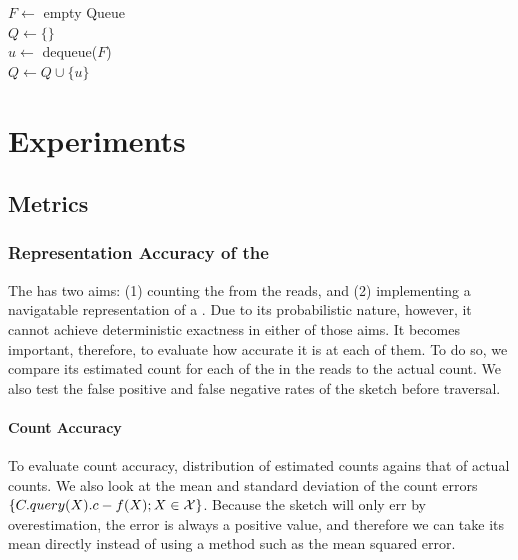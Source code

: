 \begin{algorithm}
	\caption{$T.\mathit{traverse}(\strsetname{S}, t)$}\label{alg:dbht-navigate}
  $F \gets$ empty Queue\\
  $Q \gets \{\}$\\
   {
    $u \gets$ dequeue($F$)\\
    $Q \gets Q \cup \{u\}$\\
  }
\end{algorithm}



\section{Experiments}

\subsection{Metrics}


\subsubsection{Representation Accuracy of the \dBCM}

The \dBCM has two aims: (1) counting the  from the reads, and (2) implementing a navigatable representation of a \dBG. Due to its probabilistic nature, however, it cannot achieve deterministic exactness in either of those aims. It becomes important, therefore, to evaluate how accurate it is at each of them. To do so, we compare its estimated count for each of the  in the reads to the  actual count. We also test the false positive and false negative rates of the sketch before traversal.

\paragraph{Count Accuracy} To evaluate count accuracy, distribution of estimated counts agains that of actual counts. We also look at the mean and standard deviation of the count errors $\{C.query(X).c - f(X) ; X \in \readset\}$. Because the \cm sketch will only err by overestimation, the error is always a positive value, and therefore we can take its mean directly instead of using a method such as the mean squared error.

